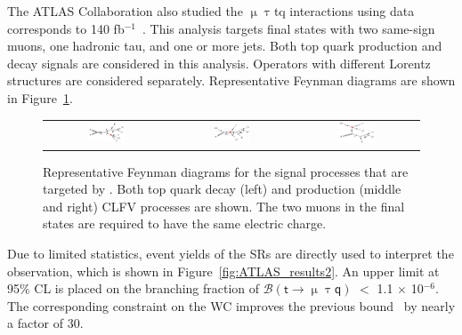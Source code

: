 The \ac{ATLAS} Collaboration also studied the $\upmu\uptau$tq interactions using data corresponds to 140 fb$^{-1}$~\cite{ATLAS-CONF-2023-001}. This analysis targets final states with two same-sign muons, one hadronic tau, and one or more jets. Both top quark production and decay signals are considered in this analysis. Operators with different Lorentz structures are considered separately. Representative Feynman diagrams are shown in Figure~\ref{fig:ATLAS_FD}. 

\begin{figure}[tbh!]
 \begin{center}
 \begin{tabular}{ccc}
 \includegraphics[width=0.31\textwidth]{figures/Part3/History/ATLAS_TT}&
 \includegraphics[width=0.33\textwidth]{figures/Part3/History/ATLAS_ST1}&
 \includegraphics[width=0.31\textwidth]{figures/Part3/History/ATLAS_ST2}\\
 \end{tabular}
 \caption{Representative Feynman diagrams for the signal processes that are targeted by \cite{ATLAS-CONF-2023-001}. Both top quark decay (left) and production (middle and right) \ac{CLFV} processes are shown. The two muons in the final states are required to have the same electric charge.}
 \label{fig:ATLAS_FD}
 \end{center}
\end{figure}

Due to limited statistics, event yields of the \acp{SR} are directly used to interpret the observation, which is shown in Figure~\ref{fig:ATLAS_results2}. An upper limit at 95\% \ac{CL} is placed on the branching fraction of $\mathcal{B}(\textsf{t}\rightarrow\upmu\uptau\textsf{q})$ $<$ 1.1 $\times$ 10$^{-6}$. The corresponding constraint on the \ac{WC} improves the previous bound~\cite{Chala:2018agk} by nearly a factor of 30.

